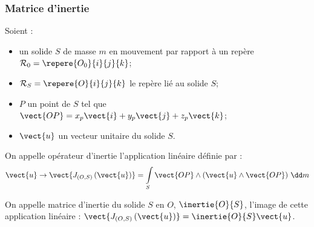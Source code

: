 %

\subsubsection{Matrice d'inertie \label{def_inert}}

\begin{defi}
Soient : 
\begin{itemize}
\item un solide $S$ de masse $m$ en mouvement par rapport à un repère $\mathcal{R}_0=\repere{O_0}{i}{j}{k}$;
\item $\mathcal{R}_S=\repere{O}{i}{j}{k}$ le repère lié au solide $S$;
\item $P$ un point de $S$ tel que $\vect{OP}=x_p\vect{i}+y_p\vect{j}+z_p\vect{k}$;
\item $\vect{u}$ un vecteur unitaire du solide $S$.
\end{itemize}

On appelle opérateur d'inertie l'application linéaire définie par :
$$
\vect{u} \rightarrow \vect{J_{\left(O,S\right)}\left(\vect{u}\right)} 
= \int\limits_{S} \vect{OP}\wedge \left(\vect{u}\wedge \vect{OP}\right)\,\dd m
$$

On appelle matrice d'inertie du solide $S$ en $O$, $\inertie{O}{S}$, l'image de cette application linéaire : $\vect{J_{\left(O,S\right)}\left(\vect{u}\right)}  = \inertie{O}{S} \vect{u}$.
 
\end{defi}


